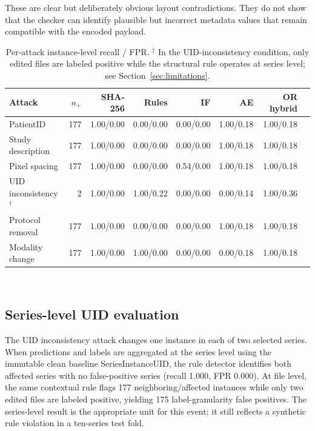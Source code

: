 \documentclass[journal]{IEEEtran}
\begin{document}
  These are clear but deliberately obvious layout contradictions. They do not show that the checker can identify plausible but incorrect metadata values that remain compatible with the encoded payload.
  
  \begin{table}[t]
  \caption{Per-attack instance-level recall / FPR. $^{\dagger}$ In the UID-inconsistency condition, only edited files are labeled positive while the structural rule operates at series level; see Section~\ref{sec:limitations}.}
  \label{tab:attack}
  \centering\scriptsize
  \setlength{\tabcolsep}{6pt}
  \begin{tabular}{lrrrrrrr}
  \toprule
  Attack & $n_+$ & SHA-256 & Rules & IF & AE & OR hybrid \\
  \midrule
  PatientID & 177 & 1.00/0.00 & 0.00/0.00 & 0.00/0.00 & 1.00/0.18 & 1.00/0.18 \\
  Study description & 177 & 1.00/0.00 & 0.00/0.00 & 0.00/0.00 & 1.00/0.18 & 1.00/0.18 \\
  Pixel spacing & 177 & 1.00/0.00 & 0.00/0.00 & 0.54/0.00 & 1.00/0.18 & 1.00/0.18 \\
  UID inconsistency$^{\dagger}$ & 2 & 1.00/0.00 & 1.00/0.22 & 0.00/0.00 & 0.00/0.14 & 1.00/0.36 \\
  Protocol removal & 177 & 1.00/0.00 & 0.00/0.00 & 0.00/0.00 & 1.00/0.18 & 1.00/0.18 \\
  Modality change & 177 & 1.00/0.00 & 1.00/0.00 & 0.00/0.00 & 0.00/0.18 & 1.00/0.18 \\
  \bottomrule
  \end{tabular}\\
  \end{table}
  
  \subsection{Series-level UID evaluation}
  The UID inconsistency attack changes one instance in each of two selected series. When predictions and labels are aggregated at the series level using the immutable clean baseline SeriesInstanceUID, the rule detector identifies both affected series with no false-positive series (recall 1.000, FPR 0.000). At file level, the same contextual rule flags 177 neighboring/affected instances while only two edited files are labeled positive, yielding 175 label-granularity false positives. The series-level result is the appropriate unit for this event; it still reflects a synthetic rule violation in a ten-series test fold.
  
\end{document}
